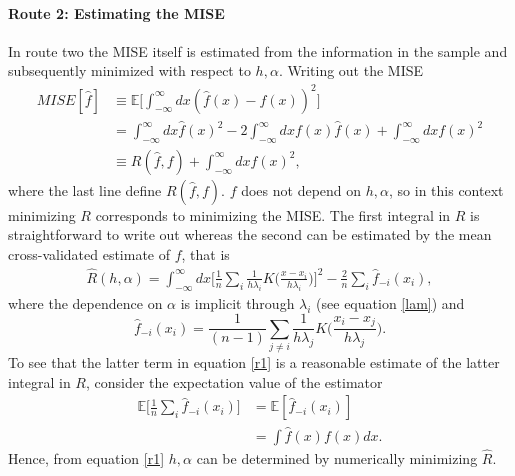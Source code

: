 \paragraph{Route 2: Estimating the MISE}
In route two the MISE itself is estimated from the information in the sample and subsequently minimized with respect to $h,\alpha$. Writing out the MISE
\begin{equation}
	\begin{split}
		MISE[\hat{f}]&\equiv \mathbb{E}\bigg[\int_{-\infty}^{\infty}dx (\hat{f}(x)-f(x))^2\bigg]\\
		&=\int_{-\infty}^{\infty}dx\hat{f}(x)^2-2\int_{-\infty}^{\infty}dxf(x)\hat{f}(x)+\int_{-\infty}^{\infty}dxf(x)^2\\
		&\equiv R(\hat{f},f)+\int_{-\infty}^{\infty}dxf(x)^2,
	\end{split}
	\label{mse4}
\end{equation}
where the last line define $R(\hat{f},f)$. $f$ does not depend on $h,\alpha$, so in this context minimizing $R$ corresponds to minimizing the MISE. The first integral in $R$ is straightforward to write out whereas the second can be estimated by the mean cross-validated estimate of $f$, that is\citep{silverman}
\begin{equation}
	\begin{split}
		\hat{R}(h,\alpha)=\int_{-\infty}^{\infty}dx \bigg[\frac{1}{n}\sum_{i}\frac{1}{h\lambda_i}K\bigg(\frac{x-x_i}{h\lambda_i}\bigg)\bigg]^2-\frac{2}{n}\sum_{i}\hat{f}_{-i}(x_i),
	\end{split}
	\label{r1}
\end{equation}
where the dependence on $\alpha$ is implicit through $\lambda_i$ (see equation \eqref{lam}) and
\begin{equation}
	\hat{f}_{-i}(x_i)=\frac{1}{(n-1)}\sum_{j\neq i}\frac{1}{h\lambda_j}K\bigg(\frac{x_i-x_j}{h\lambda_j}\bigg).
\end{equation}
To see that the latter term in equation \eqref{r1} is a reasonable estimate of the latter integral in $R$, consider the expectation value of the estimator
\begin{equation}
	\begin{split}
		\mathbb{E}\bigg[\frac{1}{n}\sum_{i}\hat{f}_{-i}(x_i)\bigg]&=\mathbb{E}[\hat{f}_{-i}(x_i)]\\
		&=\int \hat{f}(x)f(x)dx.
	\end{split}
\end{equation}
Hence, from equation \eqref{r1} $h,\alpha$ can be determined by numerically minimizing $\hat{R}$. 

